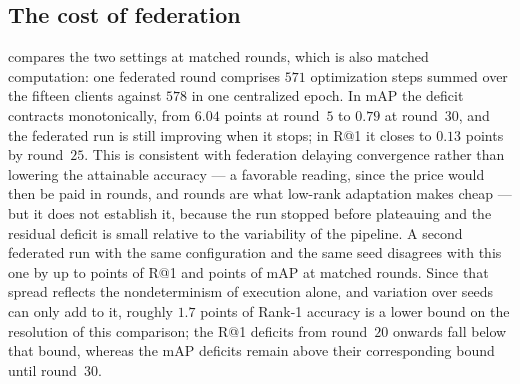 \begin{table}[t]
\centering\small
\caption{Best checkpoint of each setting on RSTPReid, in percent, selected by Rank-1 accuracy over all evaluations of the run. The first two rows are the baseline and the proposed method of the IRRA paper; the last two are our own runs, each with a single seed.}\label{tab:vsirra}
\fit{}
\end{table}

\subsection{The cost of federation}\label{sec:flgap}

 compares the two settings at matched rounds, which is also matched computation: one federated round comprises $571$ optimization steps summed over the fifteen clients against $578$ in one centralized epoch. In mAP the deficit contracts monotonically, from $6.04$ points at round~$5$ to $0.79$ at round~$30$, and the federated run is still improving when it stops; in R@1 it closes to $0.13$ points by round~$25$. This is consistent with federation delaying convergence rather than lowering the attainable accuracy --- a favorable reading, since the price would then be paid in rounds, and rounds are what low-rank adaptation makes cheap --- but it does not establish it, because the run stopped before plateauing and the residual deficit is small relative to the variability of the pipeline. A second federated run with the same configuration and the same seed disagrees with this one by up to \numNoiseR{} points of R@1 and \numNoiseM{} points of mAP at matched rounds. Since that spread reflects the nondeterminism of execution alone, and variation over seeds can only add to it, roughly $1.7$ points of Rank-1 accuracy is a lower bound on the resolution of this comparison; the R@1 deficits from round~$20$ onwards fall below that bound, whereas the mAP deficits remain above their corresponding bound until round~$30$.

\begin{table}[t]
\centering\small
\caption{Deficit of the federated run relative to the centralized reference at matched rounds, in percentage points, where $\Delta$ is the centralized value minus the federated one. $^\dagger$The centralized run has converged by this point, so its converged mean is used.}\label{tab:flgap}
\fit{}
\end{table}

